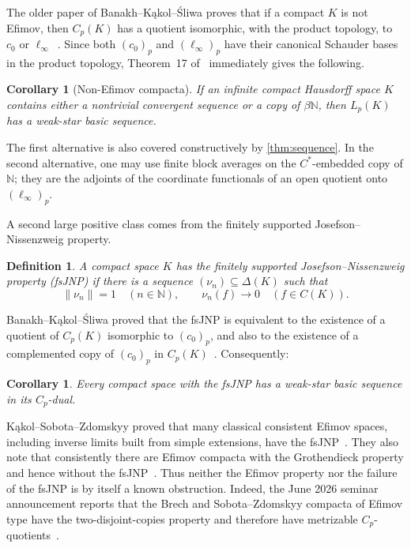 \documentclass[11pt]{article}
\newtheorem{corollary}[theorem]{Corollary}
\newtheorem{definition}[theorem]{Definition}
\newcommand{\Cp}{C_p}
\newcommand{\Lp}{L_p}
\newcommand{\N}{\mathbb{N}}
\newcommand{\czerop}{(c_0)_p}
\newcommand{\linfyp}{(\ell_\infty)_p}
\begin{document}
The older paper of Banakh--K\k{a}kol--\'Sliwa proves that if a compact $K$ is
not Efimov, then $\Cp(K)$ has a quotient isomorphic, with the product topology,
to $c_0$ or $\ell_\infty$~\cite[Corollary~3]{BKS2018MQ}.  Since both
$\czerop$ and $\linfyp$ have their canonical Schauder bases in the product
topology, Theorem~17 of~\cite{KLS2026} immediately gives the following.

\begin{corollary}[Non-Efimov compacta]\label{cor:non-efimov}
If an infinite compact Hausdorff space $K$ contains either a nontrivial
convergent sequence or a copy of $\beta\N$, then $\Lp(K)$ has a weak-star
basic sequence.
\end{corollary}

The first alternative is also covered constructively by \cref{thm:sequence}.
In the second alternative, one may use finite block averages on the
$C^*$-embedded copy of $\N$; they are the adjoints of the coordinate
functionals of an open quotient onto $\linfyp$.

A second large positive class comes from the finitely supported
Josefson--Nissenzweig property.

\begin{definition}
A compact space $K$ has the \emph{finitely supported
Josefson--Nissenzweig property} (fsJNP) if there is a sequence
$(\nu_n)\subseteq\Delta(K)$ such that
\[
 \|\nu_n\|=1\quad(n\in\N),
 \qquad
 \nu_n(f)\longrightarrow0\quad(f\in C(K)).
\]
\end{definition}

Banakh--K\k{a}kol--\'Sliwa proved that the fsJNP is equivalent to the
existence of a quotient of $\Cp(K)$ isomorphic to $\czerop$, and also to the
existence of a complemented copy of $\czerop$ in
$\Cp(K)$~\cite[Theorem~1]{BKS2019JNP}.  Consequently:

\begin{corollary}\label{cor:fsjnp}
Every compact space with the fsJNP has a weak-star basic sequence in its
$\Cp$-dual.
\end{corollary}

K\k{a}kol--Sobota--Zdomskyy proved that many classical consistent Efimov
spaces, including inverse limits built from simple extensions, have the
fsJNP~\cite[Corollary~6.12]{KSZ2023}.  They also note that consistently there
are Efimov compacta with the Grothendieck property and hence without the
fsJNP~\cite[p.~16]{KSZ2023}.  Thus neither the Efimov property nor the failure
of the fsJNP is by itself a known obstruction.  Indeed, the June 2026 seminar
announcement reports that the Brech and Sobota--Zdomskyy compacta of Efimov
type have the two-disjoint-copies property and therefore have metrizable
$\Cp$-quotients~\cite{KakolSeminar2026}.
\end{document}
